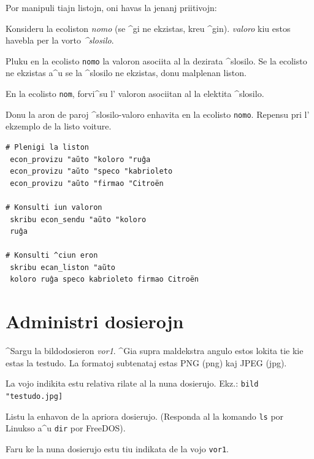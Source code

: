 Por manipuli tiajn listojn, oni havas la jenanj priitivojn:


Konsideru la ecoliston \textit{nomo} (se ^gi ne ekzistas, kreu ^gin).
\textit{valoro} kiu estos havebla per la vorto \textit{^slosilo}.


Pluku en la ecolisto \texttt{nomo} la valoron asociita al la dezirata ^slosilo.
Se la ecolisto ne ekzistas a^u se la ^slosilo ne ekzistas, donu malplenan liston.


En la ecolisto \texttt{nom}, forvi^su l' valoron asociitan al la
elektita ^slosilo.


Donu la aron de paroj ^slosilo-valoro enhavita en la ecolisto
\texttt{nomo}.  Repensu pri l' ekzemplo de la listo \og voiture\fg.
\begin{verbatim}
# Plenigi la liston
 econ_provizu "aŭto "koloro "ruĝa
 econ_provizu "aŭto "speco "kabrioleto
 econ_provizu "aŭto "firmao "Citroën

# Konsulti iun valoron
 skribu econ_sendu "aŭto "koloro
 ruĝa

# Konsulti ^ciun eron
 skribu ecan_liston "aŭto
 koloro ruĝa speco kabrioleto firmao Citroën
\end{verbatim}

\section{Administri dosierojn}
\noindent


^Sargu la bildodosieron \textit{vor1}.  ^Gia supra maldekstra angulo
estos lokita tie kie estas la testudo.  La formatoj subtenataj estas
PNG (png) kaj JPEG (jpg).

La vojo indikita estu relativa rilate al la nuna dosierujo.  Ekz.:
\texttt{bild "testudo.jpg]}


Listu la enhavon de la apriora dosierujo.  (Responda al la komando
\texttt{ls} por Linukso a^u \texttt{dir} por FreeDOS).


Faru ke la nuna dosierujo estu tiu indikata de la vojo \texttt{vor1}.

